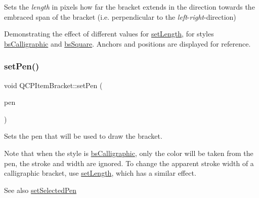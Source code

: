 Sets the {\itshape length} in pixels how far the bracket extends in the direction towards the embraced span of the bracket (i.\+e. perpendicular to the {\itshape left}-\/{\itshape right}-\/direction)

 \begin{center}Demonstrating the effect of different values for \mbox{\hyperlink{class_q_c_p_item_bracket_ac7cfc3da7da9b5c5ac5dfbe4f0351b2a}{set\+Length}}, for styles \mbox{\hyperlink{class_q_c_p_item_bracket_a7ac3afd0b24a607054e7212047d59dbda8f29f5ef754e2dc9a9efdedb2face0f3}{bs\+Calligraphic}} and \mbox{\hyperlink{class_q_c_p_item_bracket_a7ac3afd0b24a607054e7212047d59dbda7f9df4a7359bfe3dac1dbe4ccf5d220c}{bs\+Square}}. Anchors and positions are displayed for reference.\end{center}  \mbox{\label{class_q_c_p_item_bracket_ab13001d9cc5d8f9e56ea15bdda682acb}} 
\subsubsection{\texorpdfstring{setPen()}{setPen()}}
{\footnotesize\ttfamily void Q\+C\+P\+Item\+Bracket\+::set\+Pen (\begin{DoxyParamCaption}\item[{const Q\+Pen \&}]{pen }\end{DoxyParamCaption})}

Sets the pen that will be used to draw the bracket.

Note that when the style is \mbox{\hyperlink{class_q_c_p_item_bracket_a7ac3afd0b24a607054e7212047d59dbda8f29f5ef754e2dc9a9efdedb2face0f3}{bs\+Calligraphic}}, only the color will be taken from the pen, the stroke and width are ignored. To change the apparent stroke width of a calligraphic bracket, use \mbox{\hyperlink{class_q_c_p_item_bracket_ac7cfc3da7da9b5c5ac5dfbe4f0351b2a}{set\+Length}}, which has a similar effect.

\begin{DoxySeeAlso}{See also}
\mbox{\hyperlink{class_q_c_p_item_bracket_a349785c31122778a520c64891fa204c5}{set\+Selected\+Pen}} 
\end{DoxySeeAlso}
\mbox{\label{class_q_c_p_item_bracket_a349785c31122778a520c64891fa204c5}} 
